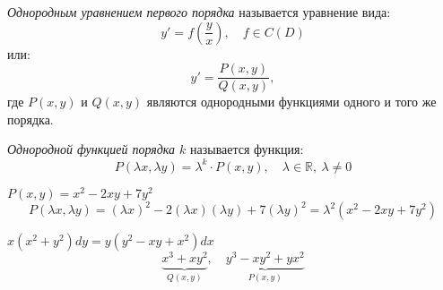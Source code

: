 \begin{definition}
    \emph{Однородным уравнением первого порядка} называется уравнение вида:
    \begin{equation}\label{eq6}
        y' = f\left(\frac{y}{x}\right),\quad f\in C(D)
    \end{equation}
    или:
    \begin{equation}\label{eq7}
        y'=\frac{P(x,y)}{Q(x,y)},
    \end{equation}
    где $P(x,y)$ и $Q(x,y)$ являются однородными функциями одного и того же порядка.
\end{definition}

\begin{definition}
    \emph{Однородной функцией порядка $k$} называется функция:
    \[
        P(\lambda x,\lambda y) = \lambda^k \cdot P(x,y),\quad \lambda \in \mathbb{R}, \ \lambda \ne 0
    \]
\end{definition}

\begin{example}
    $P(x,y) = x^2 - 2xy + 7y^2$
    \[
        P(\lambda x,\lambda y) = (\lambda x)^2 - 2(\lambda x)(\lambda y) + 7(\lambda y)^2 = \lambda^2(x^2 - 2xy + 7y^2)
    \]
\end{example}

\begin{example}
    $x(x^2 + y^2)dy = y(y^2 - xy + x^2)dx$
    \[
        \underbrace{x^3 + xy^2}_{Q(x,y)},\quad \underbrace{y^3 - xy^2 + yx^2}_{P(x,y)}
    \]
\end{example}

